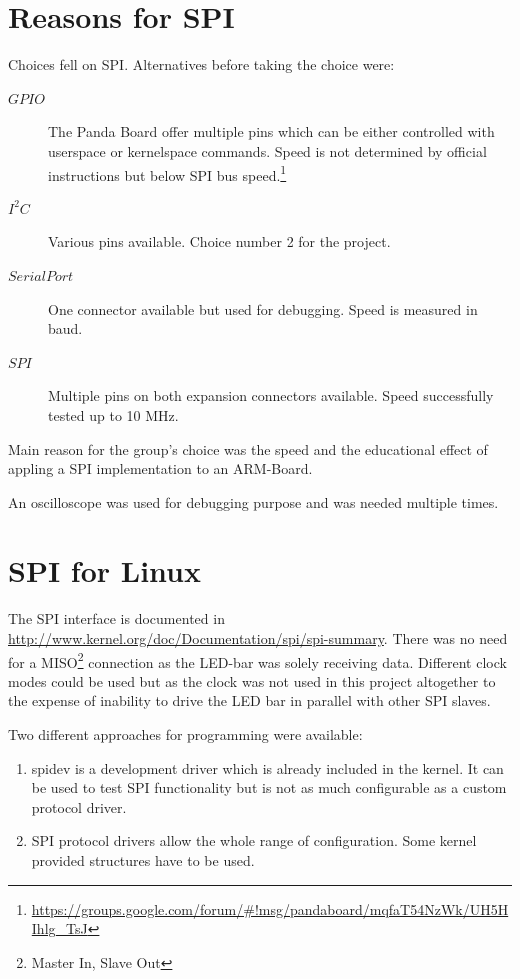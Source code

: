 \section{Reasons for SPI}

Choices fell on SPI. Alternatives before taking the choice were:

\begin{description}
\item[\(GPIO\)] The Panda Board offer multiple pins which can be either controlled with userspace or kernelspace commands. Speed is not determined by official 
instructions but below SPI bus speed.\footnote{\url{https://groups.google.com/forum/\#!msg/pandaboard/mqfaT54NzWk/UH5HIhlg\_TsJ}}
\item[\(I^2C\)] Various pins available. Choice number 2 for the project.
\item[\(Serial Port\)] One connector available but used for debugging. Speed is measured in baud.
\item[\(SPI\)] Multiple pins on both expansion connectors available. Speed successfully tested up to 10 MHz.
\end{description}

Main reason for the group's choice was the speed and the educational effect of appling a SPI implementation to an ARM-Board.

An oscilloscope was used for debugging purpose and was needed multiple times.

\section{SPI for Linux}

The SPI interface is documented in \url{http://www.kernel.org/doc/Documentation/spi/spi-summary}. There was no need for a MISO\footnote{Master In, Slave Out} connection as the LED-bar was solely receiving data.
Different clock modes could be used but as the clock was not used in this project altogether to the expense of inability to drive the LED bar in parallel with other SPI slaves.

Two different approaches for programming were available:
\begin{enumerate}
\item spidev is a development driver which is already included in the kernel. It can be used to test SPI functionality but is not as much configurable as a custom protocol driver.
\item SPI protocol drivers allow the whole range of configuration. Some kernel provided structures have to be used.
\end{enumerate}

